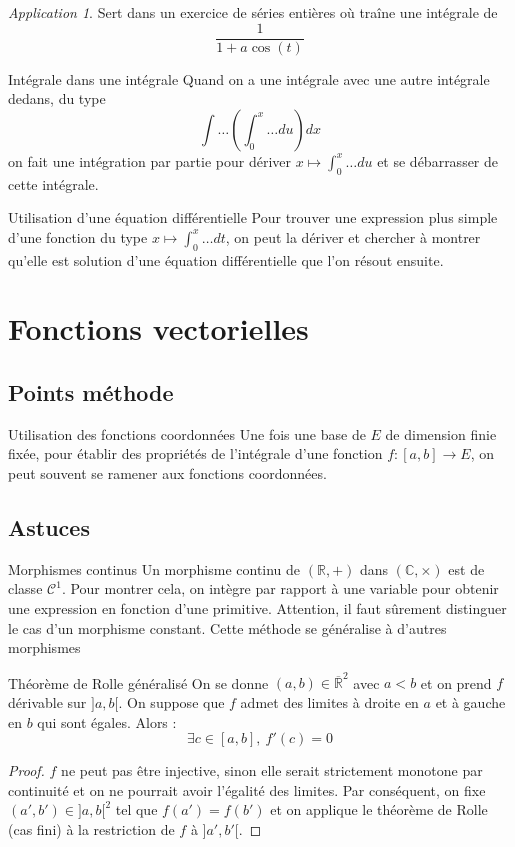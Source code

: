 \documentclass[french]{book}
\newcommand{\R}{\mathbb{R}}
\newcommand{\C}{\mathbb{C}}
\theoremstyle{plain}
\theoremstyle{definition}
\theoremstyle{remark}
\newtheorem*{app}{Application}
\begin{document}
\begin{app}
	Sert  dans un exercice de séries entières où traîne une intégrale de $$\frac{1}{1+a\cos(t)}$$
\end{app}
\begin{AS}{Intégrale dans une intégrale} Quand on a une intégrale avec une autre intégrale dedans, du type $$\int \ldots \left(\int_0^x\ldots du\right) dx$$ on fait une intégration par partie pour dériver $x\mapsto\displaystyle\int_0^x\ldots du$ et se débarrasser de cette intégrale.
\end{AS}\begin{AS}{Utilisation d'une équation différentielle} Pour trouver une expression plus simple d’une fonction du type $x\mapsto \displaystyle\int_0^x\ldots dt$, on peut la dériver et chercher à montrer qu’elle est solution d’une équation différentielle que l’on résout ensuite.
\end{AS}


\chapter{Fonctions vectorielles}
\localtableofcontents
\section{Points méthode}
\begin{PM}{Utilisation des fonctions coordonnées} Une fois une base de $E$ de dimension finie fixée, pour établir des propriétés de l'intégrale d'une fonction $f:[a,b]\to E$, on peut souvent se ramener aux fonctions coordonnées.
\end{PM}
\section{Astuces}
\begin{AS}{Morphismes continus} Un morphisme continu de $(\R,+)$ dans $(\C,\times)$ est de classe $\mathcal{C}^1$. Pour montrer cela, on intègre par rapport à une variable pour obtenir une expression en fonction d'une primitive. Attention, il faut sûrement distinguer le cas d'un morphisme constant. Cette méthode se généralise à d'autres morphismes
\end{AS}\begin{AS}{Théorème de Rolle généralisé} On se donne $(a,b)\in\overline{\R}^2$ avec $a<b$ et on prend $f$ dérivable sur $]a,b[$. On suppose que $f$ admet des limites à droite en $a$ et à gauche en $b$ qui sont égales. Alors : $$\exists c\in[a,b],\ f'(c)=0$$
\end{AS}
\begin{proof}
	$f$ ne peut pas être injective, sinon elle serait strictement monotone par continuité et on ne pourrait avoir l'égalité des limites. Par conséquent, on fixe $(a',b')\in]a,b[^2$ tel que $f(a')=f(b')$ et on applique le théorème de Rolle (cas fini) à la restriction de $f$ à $]a',b'[$.
\end{proof}
\end{document}
